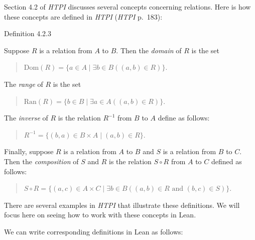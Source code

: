 \documentclass[
  letterpaper,
  DIV=11,
  numbers=noendperiod]{scrreprt}
\theoremstyle{remark}
\begin{document}
Section 4.2 of \emph{HTPI} discusses several concepts concerning
relations. Here is how these concepts are defined in \emph{HTPI}
(\emph{HTPI} p.~183):

\begin{ndfn}{Definition 4.2.3}

Suppose \(R\) is a relation from \(A\) to \(B\). Then the \emph{domain}
of \(R\) is the set

\begin{quote}
\(\text{Dom}(R) = \{a \in A \mid \exists b \in B((a, b) \in R)\}\).

\end{quote}

The \emph{range} of \(R\) is the set

\begin{quote}
\(\text{Ran}(R) = \{b \in B \mid \exists a \in A((a, b) \in R)\}\).

\end{quote}

The \emph{inverse} of \(R\) is the relation \(R^{-1}\) from \(B\) to
\(A\) define as follows:

\begin{quote}
\(R^{-1} = \{(b, a) \in B \times A \mid (a, b) \in R\}\).

\end{quote}

Finally, suppose \(R\) is a relation from \(A\) to \(B\) and \(S\) is a
relation from \(B\) to \(C\). Then the \emph{composition} of \(S\) and
\(R\) is the relation \(S \circ R\) from \(A\) to \(C\) defined as
follows:

\begin{quote}
\(S \circ R = \{(a, c) \in A \times C \mid \exists b \in B((a, b) \in R \text{ and } (b, c) \in S)\}\).

\end{quote}

\end{ndfn}

There are several examples in \emph{HTPI} that illustrate these
definitions. We will focus here on seeing how to work with these
concepts in Lean.

We can write corresponding definitions in Lean as follows:
\end{document}

